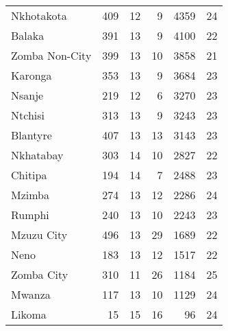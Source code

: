 \begin{tabular}{lrrrrr}
Nkhotakota     &         409 &          12 &            9 &             4359 &          24 \\
Balaka         &         391 &          13 &            9 &             4100 &          22 \\
Zomba Non-City &         399 &          13 &           10 &             3858 &          21 \\
Karonga        &         353 &          13 &            9 &             3684 &          23 \\
Nsanje         &         219 &          12 &            6 &             3270 &          23 \\
Ntchisi        &         313 &          13 &            9 &             3243 &          23 \\
Blantyre       &         407 &          13 &           13 &             3143 &          23 \\
Nkhatabay      &         303 &          14 &           10 &             2827 &          22 \\
Chitipa        &         194 &          14 &            7 &             2488 &          23 \\
Mzimba         &         274 &          13 &           12 &             2286 &          24 \\
Rumphi         &         240 &          13 &           10 &             2243 &          23 \\
Mzuzu City     &         496 &          13 &           29 &             1689 &          22 \\
Neno           &         183 &          13 &           12 &             1517 &          22 \\
Zomba City     &         310 &          11 &           26 &             1184 &          25 \\
Mwanza         &         117 &          13 &           10 &             1129 &          24 \\
Likoma         &          15 &          15 &           16 &               96 &          24 \\
\bottomrule
\end{tabular}
